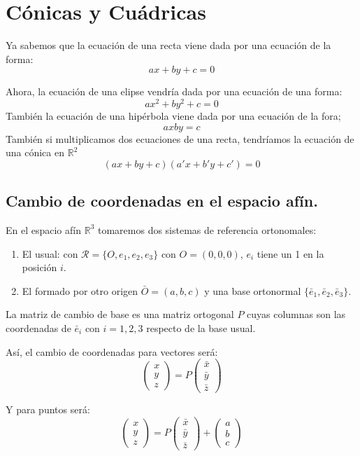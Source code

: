 \documentclass[11pt, a4paper, titlepage]{article}
\newcommand{\R}{\mathbb{R}}
\theoremstyle{theorem-style}
\theoremstyle{definition-style}
\theoremstyle{remark-style}
\theoremstyle{example-style}
\newenvironment{nlist}
{\begin{enumerate}
    \renewcommand\labelenumi{(\emph{\roman{enumi})}}}
  {\end{enumerate}}
\begin{document}
\section{Cónicas y Cuádricas}
Ya sabemos que la ecuación de una recta viene dada por una ecuación de la forma:
\[
ax + by +c = 0
\]

Ahora, la ecuación de una elipse vendría dada por una ecuación de una forma:
\[
ax^2 + by^2 + c = 0
\]
También la ecuación de una hipérbola viene dada por una ecuación de la fora;
\[
axby = c
\]
También si multiplicamos dos ecuaciones de una recta, tendríamos la ecuación de una cónica en $\R^2$
\[
(ax + by +c)(a'x+b'y+c') = 0
\]

\subsection{Cambio de coordenadas en el espacio afín.}

En el espacio afín $\R^3$ tomaremos dos sistemas de referencia ortonomales:
\begin{nlist}
	\item El usual: con $\mathcal R = \{O, e_1, e_2, e_3\}$ con $O=(0,0,0)$, $e_i$ tiene un 1 en la posición $i$.
	\item El formado por otro origen $\bar O = (a,b,c)$ y una base ortonormal $\{\bar e_1, \bar e_2, \bar e_3\}$. 
\end{nlist}

La matriz de cambio de base es una matriz ortogonal $P$ cuyas columnas son las coordenadas de $\bar e_i$ con $i=1,2,3$ respecto de la base usual.

Así, el cambio de coordenadas para vectores será:
\[
\begin{pmatrix}
x\\
y\\
z
\end{pmatrix}  = P \begin{pmatrix}
\bar x\\
\bar y\\
\bar z
\end{pmatrix} 
\]

Y para puntos será:
\[
\begin{pmatrix}
x\\
y\\
z
\end{pmatrix} = P \begin{pmatrix}
\bar x\\
\bar y\\
\bar z
\end{pmatrix}  + \begin{pmatrix}
 a\\ 
 b\\
 c
\end{pmatrix} 
\]
\end{document}
